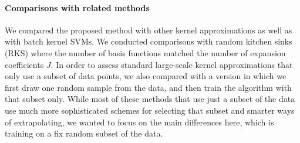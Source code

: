 \documentclass{article} %
\begin{document}
\paragraph{Comparisons with related methods}
We compared the proposed method with other kernel approximations as well as with batch kernel SVMs. We conducted comparisons with random kitchen sinks (RKS) where the number of basis functions matched the number of expansion coefficients $J$. In order to assess standard large-scale kernel approximations that only use a subset of data points, we also compared with a version in which we first draw one random sample from the data, and then train the algorithm with that subset only. While most of these methods that use just a subset of the data use much more sophisticated schemes for selecting that subset and smarter ways of extrapolating, we wanted to focus on the main differences here, which is training on a fix random subset of the data. 
\end{document}
